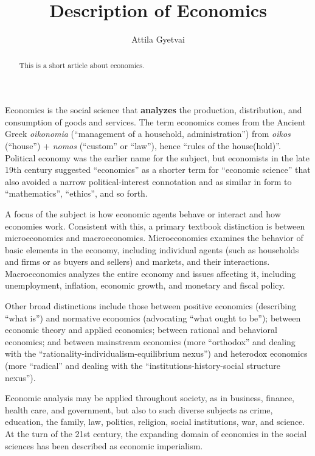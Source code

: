\documentclass[11pt]{article}			%
\title{Description of Economics}
\author{Attila Gyetvai}
\begin{document}
\maketitle						%

\begin{abstract}
	This is a short article about economics.
\end{abstract}

Economics is the social science that \textbf{analyzes} the production, distribution, and consumption of goods and services.
The term economics comes from the Ancient Greek \emph{oikonomia} (``management of a household, administration'') from \emph{oikos} (``house'') + \emph{nomos} (``custom'' or ``law''), hence ``rules of the house(hold)''.
Political economy was the earlier name for the subject, but economists in the late 19th century suggested ``economics'' as a shorter term for ``economic science'' that also avoided a narrow political-interest connotation and as similar in form to ``mathematics'', ``ethics'', and so forth.

A focus of the subject is how economic agents behave or interact and how economies work.
Consistent with this, a primary textbook distinction is between microeconomics and macroeconomics.
Microeconomics examines the behavior of basic elements in the economy, including individual agents (such as households and firms or as buyers and sellers) and markets, and their interactions.
Macroeconomics analyzes the entire economy and issues affecting it, including unemployment, inflation, economic growth, and monetary and fiscal policy.

\smallskip

Other broad distinctions include those between positive economics (describing ``what is'') and normative economics (advocating ``what ought to be''); between economic theory and applied economics; between rational and behavioral economics; and between mainstream economics (more ``orthodox'' and dealing with the ``rationality-individualism-equilibrium nexus'') and heterodox economics (more ``radical'' and dealing with the ``institutions-history-social structure nexus'').

\bigskip

\begin{flushright}
	Economic analysis may be applied throughout society, as in business, finance, health care, and government, but also to such diverse subjects as crime, education, the family, law, politics, religion, social institutions, war, and science.
	At the turn of the 21st century, the expanding domain of economics in the social sciences has been described as economic imperialism.
\end{flushright}
\end{document}
